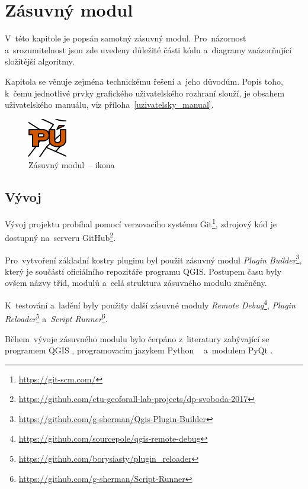 \chapter{Zásuvný modul}
\label{plugin}

V~této kapitole je popsán samotný zásuvný modul. Pro~názornost a~srozumitelnost jsou zde uvedeny důležité části kódu a~diagramy znázorňující složitější algoritmy.

Kapitola se věnuje zejména technickému řešení a~jeho důvodům. Popis toho, k~čemu jednotlivé prvky grafického uživatelského rozhraní slouží, je obsahem uživatelského manuálu, viz příloha~\ref{uzivatelsky_manual}.

	\begin{figure}[H]
		\centering
		\includegraphics[width=.1\textwidth]{./pictures/puplugin.png}
		\caption[Zásuvný modul~– ikona]{Zásuvný modul~– ikona}
		\label{fig:ikona_pluginu}
 	\end{figure}

\section{Vývoj}
\label{vyvoj}

Vývoj projektu probíhal pomocí verzovacího systému Git\footnote{\url{https://git-scm.com/}}, zdrojový kód je dostupný na~serveru GitHub\footnote{\url{https://github.com/ctu-geoforall-lab-projects/dp-svoboda-2017}}.

Pro~vytvoření základní kostry pluginu byl použit zásuvný modul \textit{Plugin Builder}\footnote{\url{https://github.com/g-sherman/Qgis-Plugin-Builder}}, který je součástí oficiálního repozitáře programu QGIS. Postupem času byly ovšem názvy tříd, modulů a~celá struktura zásuvného modulu změněny.

K~testování a~ladění byly použity další zásuvné moduly \textit{Remote Debug}\footnote{\url{https://github.com/sourcepole/qgis-remote-debug}}, \textit{Plugin Reloader}\footnote{\url{https://github.com/borysiasty/plugin_reloader}} a~\textit{Script Runner}\footnote{\url{https://github.com/g-sherman/Script-Runner}}.

Během~vývoje zásuvného modulu bylo čerpáno z~literatury zabývající se programem QGIS \citep{pyqgis_book}, programovacím jazykem Python \citep{python3_oop_book}~\citep{dive_into_python} a~modulem PyQt \citep{pyqt_book}.

